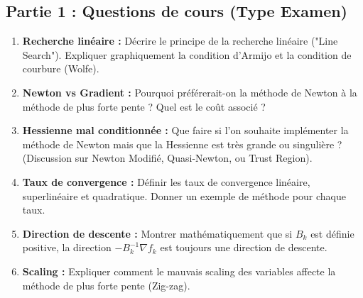 \subsection*{Partie 1 : Questions de cours (Type Examen)}
\bigskip
\begin{exercice}
\begin{enumerate}
    \item \textbf{Recherche linéaire :} Décrire le principe de la recherche linéaire ("Line Search"). Expliquer graphiquement la condition d'Armijo et la condition de courbure (Wolfe).
    \item \textbf{Newton vs Gradient :} Pourquoi préférerait-on la méthode de Newton à la méthode de plus forte pente ? Quel est le coût associé ?
    \item \textbf{Hessienne mal conditionnée :} Que faire si l'on souhaite implémenter la méthode de Newton mais que la Hessienne est très grande ou singulière ? (Discussion sur Newton Modifié, Quasi-Newton, ou Trust Region).
    \item \textbf{Taux de convergence :} Définir les taux de convergence linéaire, superlinéaire et quadratique. Donner un exemple de méthode pour chaque taux.
    \item \textbf{Direction de descente :} Montrer mathématiquement que si $B_k$ est définie positive, la direction $-B_k^{-1} \nabla f_k$ est toujours une direction de descente.
    \item \textbf{Scaling :} Expliquer comment le mauvais scaling des variables affecte la méthode de plus forte pente (Zig-zag).
\end{enumerate}
\end{exercice}

